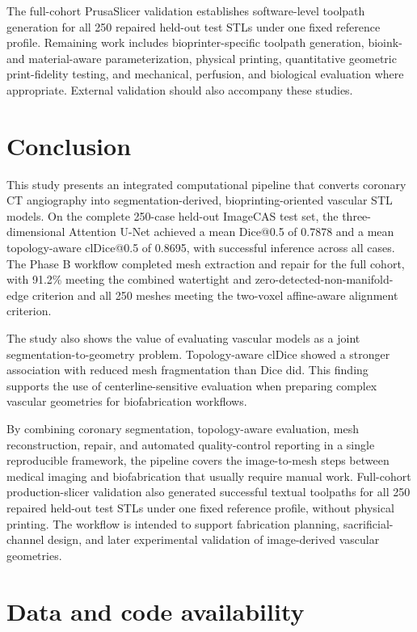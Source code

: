 \documentclass[anonymous]{iopjournal}
\begin{document}
The full-cohort PrusaSlicer validation establishes software-level toolpath generation for all 250 repaired held-out test STLs under one fixed reference profile. Remaining work includes bioprinter-specific toolpath generation, bioink- and material-aware parameterization, physical printing, quantitative geometric print-fidelity testing, and mechanical, perfusion, and biological evaluation where appropriate. External validation should also accompany these studies.

\section{Conclusion}

This study presents an integrated computational pipeline that converts coronary CT angiography into segmentation-derived, bioprinting-oriented vascular STL models. On the complete 250-case held-out ImageCAS test set, the three-dimensional Attention U-Net achieved a mean Dice@0.5 of 0.7878 and a mean topology-aware clDice@0.5 of 0.8695, with successful inference across all cases. The Phase B workflow completed mesh extraction and repair for the full cohort, with 91.2\% meeting the combined watertight and zero-detected-non-manifold-edge criterion and all 250 meshes meeting the two-voxel affine-aware alignment criterion.

The study also shows the value of evaluating vascular models as a joint segmentation-to-geometry problem. Topology-aware clDice showed a stronger association with reduced mesh fragmentation than Dice did. This finding supports the use of centerline-sensitive evaluation when preparing complex vascular geometries for biofabrication workflows.

By combining coronary segmentation, topology-aware evaluation, mesh reconstruction, repair, and automated quality-control reporting in a single reproducible framework, the pipeline covers the image-to-mesh steps between medical imaging and biofabrication that usually require manual work. Full-cohort production-slicer validation also generated successful textual toolpaths for all 250 repaired held-out test STLs under one fixed reference profile, without physical printing. The workflow is intended to support fabrication planning, sacrificial-channel design, and later experimental validation of image-derived vascular geometries.

\section*{Data and code availability}
\end{document}
